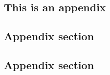 
\newpage\pagestyle{appendices}
\begin{appendices}

\chapter{This is an appendix}\label{appendix}
\section{Appendix section}
\Blindtext
\section{Appendix section}
\Blindtext

\blinddocument
\end{appendices}